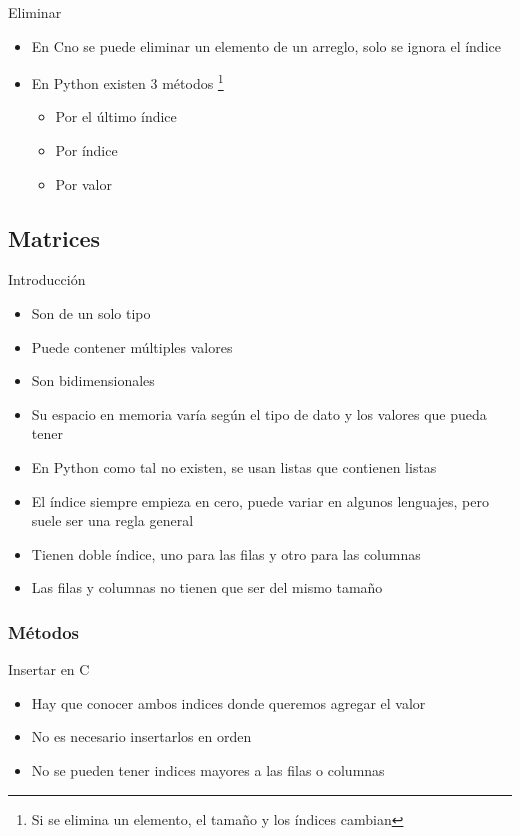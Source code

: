 \documentclass{beamer}
\newcommand{\Rplus}{\protect\hspace{-.1em}\protect\raisebox{.35ex}{\smaller{\smaller\textbf{+}}}}
\newcommand{\Cpp}{\mbox{C\Rplus\Rplus}\hspace{3pt}}
\begin{document}
\begin{frame}{Eliminar}
	\begin{itemize}
		\item En \Cpp no se puede eliminar un elemento de un arreglo, solo se ignora el \'indice 
		\item En Python existen 3 m\'etodos \footnote{Si se elimina un elemento, el tamaño y los \'indices cambian}
		\begin{itemize}
			\item Por el \'ultimo \'indice
			\item Por \'indice
			\item Por valor
		\end{itemize}
	\end{itemize}
\end{frame}

\subsection{Matrices}
\begin{frame}{Introducci\'on}
	\begin{itemize}
		\item Son de un solo tipo
		\item Puede contener m\'ultiples valores
		\item Son bidimensionales
		\item Su espacio en memoria var\'ia seg\'un el tipo de dato y los valores que pueda tener
		\item En Python como tal no existen, se usan listas que contienen listas
		\item El \'indice siempre empieza en cero, puede variar en algunos lenguajes, pero suele ser una regla general
		\item Tienen doble índice, uno para las filas y otro para las columnas
		\item Las filas y columnas no tienen que ser del mismo tamaño
	\end{itemize}
\end{frame}

\subsubsection{M\'etodos}
\begin{frame}{Insertar en \Cpp}
	\begin{itemize}
		\item Hay que conocer ambos indices donde queremos agregar el valor
		\item No es necesario insertarlos en orden
		\item No se pueden tener indices mayores a las filas o columnas
	\end{itemize}
	\centering
\end{frame}
\end{document}
